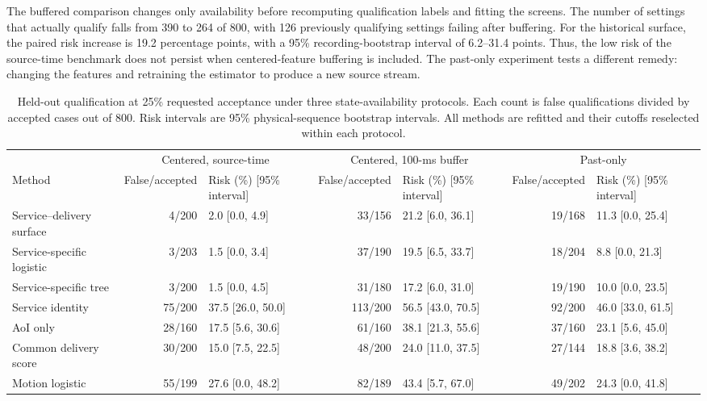 \documentclass[journal]{IEEEtran}
\newcommand{\revision}[1]{#1}
\newcommand{\secondrev}[1]{{#1}}
\begin{document}
\revision{The buffered comparison changes only availability before
recomputing qualification labels and fitting the screens. The number of
settings that actually qualify falls from 390 to 264 of 800, with 126
previously qualifying settings failing after buffering. For the historical
surface, the paired risk increase is 19.2 percentage points, with a 95\%
recording-bootstrap interval of 6.2--31.4 points. Thus, the low risk of the
source-time benchmark does not persist when centered-feature buffering
is included. The past-only experiment tests a different remedy: changing
the features and retraining the estimator to produce a new source stream.}

\begin{table}[!tb]
    \centering
    \footnotesize
    \secondrev{%
    \caption{Held-out qualification at 25\% requested acceptance under
    three state-availability protocols.
    Each count is false qualifications divided by accepted cases out of
    800. Risk intervals are 95\% physical-sequence bootstrap intervals.
    All methods are refitted and their cutoffs reselected within each protocol.}
    \label{tab:heldout_risk}
    \setlength{\tabcolsep}{3pt}
    \begin{tabular}{@{}lrlrlrl@{}}
        \toprule
        & \multicolumn{2}{c}{Centered, source-time} &
        \multicolumn{2}{c}{Centered, 100-ms buffer} &
        \multicolumn{2}{c}{Past-only} \\
        \cmidrule(lr){2-3} \cmidrule(lr){4-5} \cmidrule(lr){6-7}
        Method & False/accepted & Risk (\%) [95\% interval] &
        False/accepted & Risk (\%) [95\% interval] &
        False/accepted & Risk (\%) [95\% interval] \\
        \midrule
        Service--delivery surface & 4/200 & 2.0 [0.0, 4.9] &
            33/156 & 21.2 [6.0, 36.1] & 19/168 & 11.3 [0.0, 25.4] \\
        Service-specific logistic & 3/203 & 1.5 [0.0, 3.4] &
            37/190 & 19.5 [6.5, 33.7] &
            18/204 & 8.8 [0.0, 21.3] \\
        Service-specific tree & 3/200 & 1.5 [0.0, 4.5] &
            31/180 & 17.2 [6.0, 31.0] &
            19/190 & 10.0 [0.0, 23.5] \\
        Service identity & 75/200 & 37.5 [26.0, 50.0] &
            113/200 & 56.5 [43.0, 70.5] & 92/200 & 46.0 [33.0, 61.5] \\
        AoI only & 28/160 & 17.5 [5.6, 30.6] &
            61/160 & 38.1 [21.3, 55.6] & 37/160 & 23.1 [5.6, 45.0] \\
        Common delivery score & 30/200 & 15.0 [7.5, 22.5] &
            48/200 & 24.0 [11.0, 37.5] & 27/144 & 18.8 [3.6, 38.2] \\
        Motion logistic & 55/199 & 27.6 [0.0, 48.2] &
            82/189 & 43.4 [5.7, 67.0] & 49/202 & 24.3 [0.0, 41.8] \\
        \bottomrule
    \end{tabular}
    }
\end{table}
\end{document}
